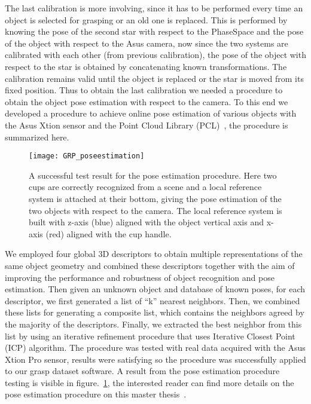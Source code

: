 The last calibration is more involving, since it has to be performed every time an object is selected for grasping or an old one is replaced. This is performed by knowing the pose of the second star with respect to the PhaseSpace and the
pose of the object with respect to the Asus camera, now since the two systems are calibrated with each other (from previous calibration), the pose of the object with respect to the star is obtained by concatenating known transformations.
The calibration remains valid until the object is replaced or the star is moved from its fixed position.
Thus to obtain the last calibration we needed a procedure to obtain the object pose estimation with respect to the camera. To this end we developed a procedure to achieve online pose estimation of various objects with the Asus Xtion sensor
and the Point Cloud Library (PCL)~\cite{web:pcl}, the procedure is summarized here.

\begin{figure}[tb!]
  \centering
  \texttt{[image: GRP\_poseestimation]}
  \caption{A successful test result for the pose estimation procedure. Here two cups are correctly recognized from a scene and a local reference system is attached at their bottom, giving the pose estimation of the two objects with respect to the camera.
  The local reference system is built with z-axis (blue) aligned with the object vertical axis and x-axis (red) aligned with the cup handle.}
  \label{fig:grasp:pe}
\end{figure}

We employed four global 3D descriptors to obtain multiple representations of the same object geometry and combined these descriptors together with the aim of improving the performance and robustness of object recognition and pose estimation.
Then given an unknown object and database of known poses, for each descriptor, we first generated a list of ``k'' nearest neighbors. Then, we combined these lists for generating a composite list, which contains the neighbors agreed
by the majority of the descriptors. Finally, we extracted the best neighbor from this list by using an iterative refinement procedure that uses Iterative Closest Point (ICP) algorithm. The procedure was tested with real data acquired
with the Asus Xtion Pro sensor, results were satisfying so the procedure was successfully applied to our grasp dataset software. A result from the pose estimation procedure testing is visible in figure.~\ref{fig:grasp:pe}, the interested reader 
can find more details on the pose estimation procedure on this master thesis~\cite{thesis:spinelli}. 
